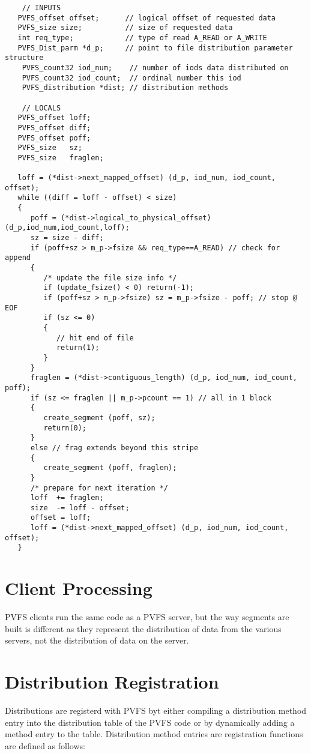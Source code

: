 \documentclass[11pt]{article}
\begin{document}
\begin{verbatim}
	// INPUTS
   PVFS_offset offset;      // logical offset of requested data
   PVFS_size size;          // size of requested data
   int req_type;            // type of read A_READ or A_WRITE
   PVFS_Dist_parm *d_p;     // point to file distribution parameter structure
	PVFS_count32 iod_num;    // number of iods data distributed on
	PVFS_count32 iod_count;  // ordinal number this iod
	PVFS_distribution *dist; // distribution methods

	// LOCALS
   PVFS_offset loff;
   PVFS_offset diff;
   PVFS_offset poff;
   PVFS_size   sz;
   PVFS_size   fraglen;

   loff = (*dist->next_mapped_offset) (d_p, iod_num, iod_count, offset);
   while ((diff = loff - offset) < size)
   {
      poff = (*dist->logical_to_physical_offset)(d_p,iod_num,iod_count,loff);
      sz = size - diff;
      if (poff+sz > m_p->fsize && req_type==A_READ) // check for append 
      {
         /* update the file size info */
         if (update_fsize() < 0) return(-1);
         if (poff+sz > m_p->fsize) sz = m_p->fsize - poff; // stop @ EOF
         if (sz <= 0)
         {
            // hit end of file
            return(1);
         }
      }
      fraglen = (*dist->contiguous_length) (d_p, iod_num, iod_count, poff);
      if (sz <= fraglen || m_p->pcount == 1) // all in 1 block
      {
         create_segment (poff, sz);
         return(0);
      }
      else // frag extends beyond this stripe
      {
         create_segment (poff, fraglen);
      }
      /* prepare for next iteration */
      loff  += fraglen;
      size  -= loff - offset;
      offset = loff;
      loff = (*dist->next_mapped_offset) (d_p, iod_num, iod_count, offset);
   }
\end{verbatim}

\section{Client Processing}

PVFS clients run the same code as a PVFS server, but the way segments
are built is different as they represent the distribution of data from
the various servers, not the distribution of data on the server.

\section{Distribution Registration}

Distributions are registerd with PVFS byt either compiling a
distribution method entry into the distribution table of the PVFS code
or by dynamically adding a method entry to the table.   Distribution
method entries are registration functions are defined as follows:
\end{document}
